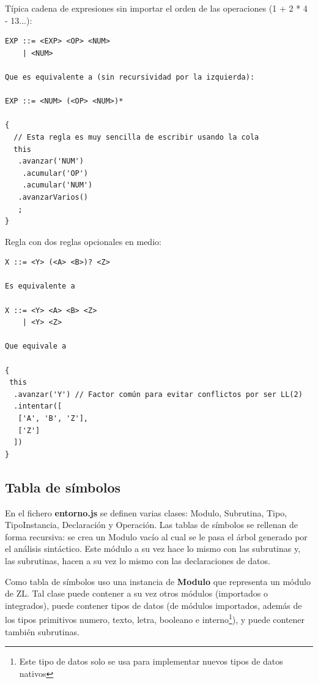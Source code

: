 \documentclass{report}
\begin{document}
	\vspace{10px}
	Típica cadena de expresiones sin importar el orden de las operaciones (1 + 2 * 4 - 13...):
	
	\begin{BVerbatim}
EXP ::= <EXP> <OP> <NUM>
    | <NUM>
    
Que es equivalente a (sin recursividad por la izquierda):

EXP ::= <NUM> (<OP> <NUM>)*    
 
{
  // Esta regla es muy sencilla de escribir usando la cola
  this
   .avanzar('NUM')
    .acumular('OP')
    .acumular('NUM')
   .avanzarVarios()
   ;
} 
	\end{BVerbatim}
	
	Regla con dos reglas opcionales en medio:
	
	\begin{BVerbatim}
X ::= <Y> (<A> <B>)? <Z>

Es equivalente a

X ::= <Y> <A> <B> <Z>
    | <Y> <Z>
    
Que equivale a

{
 this
  .avanzar('Y') // Factor común para evitar conflictos por ser LL(2)
  .intentar([
   ['A', 'B', 'Z'],
   ['Z']
  ])
}
	\end{BVerbatim}
	
	\subsection{Tabla de símbolos}
	
	En el fichero \textbf{entorno.js} se definen varias clases: Modulo, Subrutina, Tipo, TipoInstancia, Declaración y Operación. Las tablas de símbolos se rellenan de forma recursiva: se crea un Modulo vacío al cual se le pasa el árbol generado por el análisis sintáctico. Este módulo a su vez hace lo mismo con las subrutinas y, las subrutinas, hacen a su vez lo mismo con las declaraciones de datos.
	
	\vspace{10px}
	
	Como tabla de símbolos uso una instancia de \textbf{Modulo} que representa un módulo de ZL. Tal clase puede contener a su vez otros módulos (importados o integrados), puede contener tipos de datos (de módulos importados, además de los tipos primitivos numero, texto, letra, booleano e interno\footnote{Este tipo de datos solo se usa para implementar nuevos tipos de datos nativos}), y puede contener también subrutinas.
	
\end{document}
